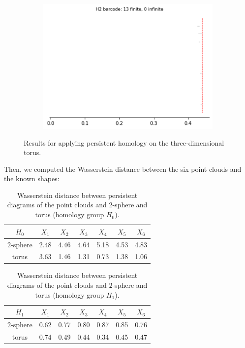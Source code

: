 \begin{figure}[H]
\begin{subfigure}[b]{0.24\textwidth}
\includegraphics[width=\textwidth]{figures/torus_H2_barcode.png}
 \caption{}
\end{subfigure}
\caption{Results for applying persistent homology on the three-dimensional torus.}
\end{figure}

Then, we computed the Wasserstein distance between the six point clouds and the known shapes:

\begin{table}[!htbp]
        \centering
        \small
        \setlength\tabcolsep{5pt}
        \begin{tabular}{|c|c|c|c|c|c|c|}
\hline
  $H_0$& $X_1$ & $X_2$ & $X_3$ & $X_4$ & $X_5$ & $X_6$ \\ \hline
$2$-sphere & 2.48 & 4.46&  4.64 & 5.18 & 4.53 & 4.83\\\hline
torus & 3.63 &  1.46 & 1.31 & 0.73 & 1.38 & 1.06 \\ \hline
\end{tabular}
\caption{Wasserstein distance between persistent diagrams of the point clouds and $2$-sphere and torus (homology group $H_0$).}
\label{tab:sphere-H0}
\end{table}


\begin{table}[!htbp]
        \centering
        \small
        \setlength\tabcolsep{5pt}
        \begin{tabular}{|c|c|c|c|c|c|c|}
\hline
$H_1$& $X_1$ & $X_2$ & $X_3$ & $X_4$ & $X_5$ & $X_6$ \\ \hline
$2$-sphere & 0.62 &   0.77 & 0.80 & 0.87 & 0.85 & 0.76\\\hline
torus & 0.74 & 0.49 & 0.44 & 0.34 & 0.45 & 0.47\\ \hline
\end{tabular}
\caption{Wasserstein distance between persistent diagrams of the point clouds and $2$-sphere and torus (homology group $H_1$).}
\label{tab:sphere-H1}
\end{table}

